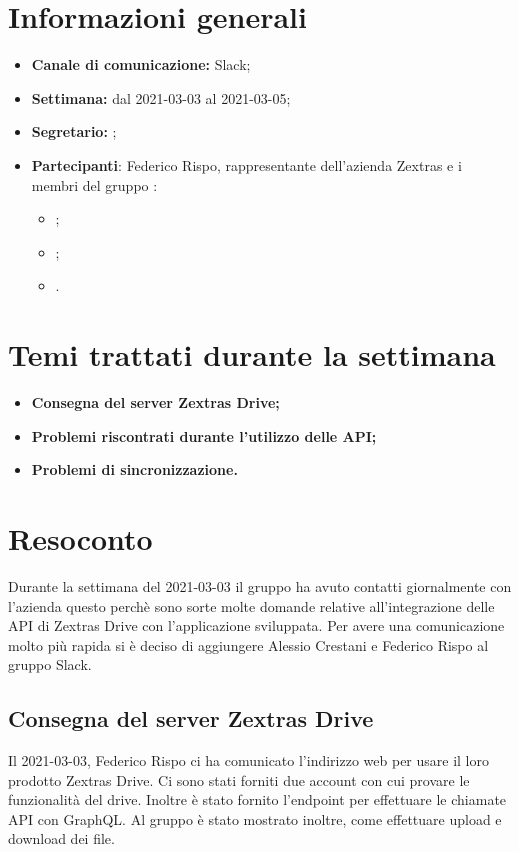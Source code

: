\section{Informazioni generali}

\begin{itemize}

    \item \textbf{Canale di comunicazione:} Slack;

    \item \textbf{Settimana:} dal 2021-03-03 al 2021-03-05;

    \item \textbf{Segretario:} \Davide{};

    \item \textbf{Partecipanti}: Federico Rispo, rappresentante dell'azienda Zextras e i membri del gruppo \Gruppo{}:
        \begin{itemize}
            \item \Daniele{};
            \item \Davide{};
            \item \Matteo{}.
        \end{itemize}

\end{itemize}
\section{Temi trattati durante la settimana}

\begin{itemize}
    \item\textbf{Consegna del server Zextras Drive;}
    \item\textbf{Problemi riscontrati durante l'utilizzo delle API;}
    \item\textbf{Problemi di sincronizzazione.}
\end{itemize}
\newpage


\section{Resoconto}
Durante la settimana del 2021-03-03 il gruppo \textit{\Gruppo{}} ha avuto contatti giornalmente con l'azienda questo perchè sono sorte molte domande relative all'integrazione delle API di Zextras Drive con l'applicazione sviluppata.
Per avere una comunicazione molto più rapida si è deciso di aggiungere Alessio Crestani e Federico Rispo al gruppo Slack.

\subsection{Consegna del server Zextras Drive}
Il 2021-03-03, Federico Rispo ci ha comunicato l'indirizzo web per usare il loro prodotto Zextras Drive. Ci sono stati forniti due account con cui provare le funzionalità del drive.
Inoltre è stato fornito l'endpoint per effettuare le chiamate API con GraphQL. Al gruppo è stato mostrato inoltre, come effettuare upload e download dei file.

